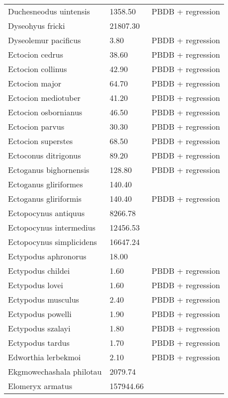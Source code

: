 \begin{longtable}{p{} p{} p{}}
    Duchesneodus uintensis & 1358.50 & PBDB + regression \\ 
    Dyseohyus fricki & 21807.30 & \cite{Tomiya2013} \\ 
    Dyseolemur pacificus & 3.80 & PBDB + regression \\ 
    Ectocion cedrus & 38.60 & PBDB + regression \\ 
    Ectocion collinus & 42.90 & PBDB + regression \\ 
    Ectocion major & 64.70 & PBDB + regression \\ 
    Ectocion mediotuber & 41.20 & PBDB + regression \\ 
    Ectocion osbornianus & 46.50 & PBDB + regression \\ 
    Ectocion parvus & 30.30 & PBDB + regression \\ 
    Ectocion superstes & 68.50 & PBDB + regression \\ 
    Ectoconus ditrigonus & 89.20 & PBDB + regression \\ 
    Ectoganus bighornensis & 128.80 & PBDB + regression \\ 
    Ectoganus gliriformes & 140.40 & \cite{Novacek1977} \\ 
    Ectoganus gliriformis & 140.40 & PBDB + regression \\ 
    Ectopocynus antiquus & 8266.78 & \cite{Tomiya2013} \\ 
    Ectopocynus intermedius & 12456.53 & \cite{Tomiya2013} \\ 
    Ectopocynus simplicidens & 16647.24 & \cite{Tomiya2013} \\ 
    Ectypodus aphronorus & 18.00 & \cite{Wilson2012} \\ 
    Ectypodus childei & 1.60 & PBDB + regression \\ 
    Ectypodus lovei & 1.60 & PBDB + regression \\ 
    Ectypodus musculus & 2.40 & PBDB + regression \\ 
    Ectypodus powelli & 1.90 & PBDB + regression \\ 
    Ectypodus szalayi & 1.80 & PBDB + regression \\ 
    Ectypodus tardus & 1.70 & PBDB + regression \\ 
    Edworthia lerbekmoi & 2.10 & PBDB + regression \\ 
    Ekgmowechashala philotau & 2079.74 & \cite{Tomiya2013} \\ 
    Elomeryx armatus & 157944.66 & \cite{Tomiya2013} \\ 

\end{longtable}

